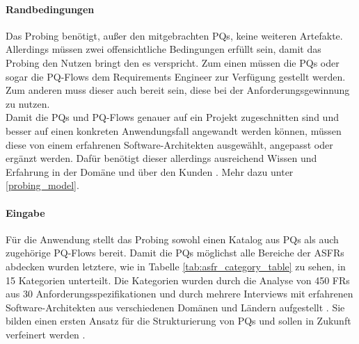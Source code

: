 \paragraph{Randbedingungen}

Das Probing benötigt, außer den mitgebrachten PQs, keine weiteren Artefakte. Allerdings müssen zwei offensichtliche Bedingungen erfüllt sein, damit das Probing den Nutzen bringt den es verspricht. Zum einen müssen die PQs oder sogar die PQ-Flows dem Requirements Engineer zur Verfügung gestellt werden. Zum anderen muss dieser auch bereit sein, diese bei der Anforderungsgewinnung zu nutzen. \\

Damit die PQs und PQ-Flows genauer auf ein Projekt zugeschnitten sind und besser auf einen konkreten Anwendungsfall angewandt werden können, müssen diese von einem erfahrenen Software-Architekten ausgewählt, angepasst oder ergänzt werden. Dafür benötigt dieser allerdings ausreichend Wissen und Erfahrung in der Domäne und über den Kunden \cite{Ros02}. Mehr dazu unter \ref{probing_model}. \\

\paragraph{Eingabe}

Für die Anwendung stellt das Probing sowohl einen Katalog aus PQs als auch zugehörige PQ-Flows bereit. Damit die PQs möglichst alle Bereiche der ASFRs abdecken wurden letztere, wie in Tabelle \ref{tab:asfr_category_table} zu sehen, in 15 Kategorien unterteilt. Die Kategorien wurden durch die Analyse von 450 FRs aus 30 Anforderungsspezifikationen und durch mehrere Interviews mit erfahrenen Software-Architekten aus verschiedenen Domänen und Ländern aufgestellt  \cite{Ros02} \cite{Ros03}. Sie bilden einen ersten Ansatz für die Strukturierung von PQs und sollen in Zukunft verfeinert werden \cite{Ros03}. \\ 

